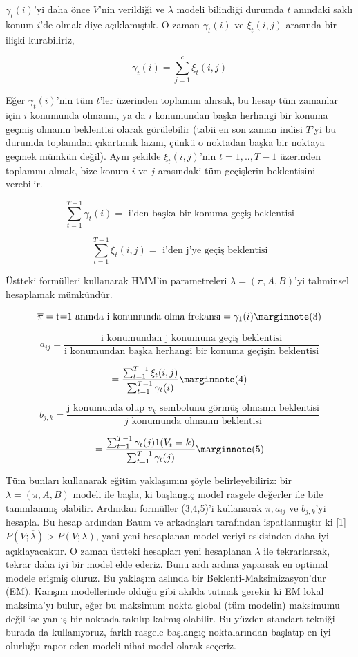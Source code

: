 \documentclass[12pt,fleqn]{article}\usepackage{../../common}
\begin{document}
$\gamma_t(i)$'yi daha önce $V$'nin verildiği ve $\lambda$ modeli bilindiği
durumda $t$ anındaki saklı konum $i$'de olmak diye açıklamıştık. O zaman 
$\gamma_t(i)$ ve $\xi_t(i,j)$ arasında bir ilişki kurabiliriz,

$$ \gamma_t(i) =  \sum_{j=1}^{c} \xi_t(i,j) $$

Eğer $\gamma_t(i)$'nin tüm $t$'ler üzerinden toplamını alırsak, bu hesap
tüm zamanlar için $i$ konumunda olmanın, ya da $i$ konumundan başka
herhangi bir konuma geçmiş olmanın beklentisi olarak görülebilir (tabii en
son zaman indisi $T$'yi bu durumda toplamdan çıkartmak lazım, çünkü o
noktadan başka bir noktaya geçmek mümkün değil). Aynı şekilde
$\xi_t(i,j)$'nin $t=1,..,T-1$ üzerinden toplamını almak, bize konum $i$ ve
$j$ arasındaki tüm geçişlerin beklentisini verebilir.


$$ \sum_{t=1}^{T-1} \gamma_t(i) = \textrm{ i'den başka bir konuma geçiş beklentisi} $$

$$ \sum_{t=1}^{T-1} \xi_t(i,j) = \textrm{ i'den j'ye geçiş beklentisi} $$

Üstteki formülleri kullanarak HMM'in parametreleri $\lambda = (\pi,A,B)
$'yi tahminsel hesaplamak mümkündür. 

$$ \overline{\pi} = \textrm{t=1 anında i konumunda olma frekansı} = \gamma_1(i)
\mlabel{3}
$$

$$ \overline{a_{ij}} = \frac{\textrm{i konumundan j konumuna geçiş beklentisi}}
{\textrm{i konumundan başka herhangi bir konuma geçişin beklentisi}}
$$

$$  = \frac{ \sum_{t=1}^{T-1}\xi_t(i,j) }{ \sum_{t=1}^{T-1} \gamma_t(i) } 
\mlabel{4}
$$

$$ 
\overline{b_{j,k}} = 
\frac{\textrm{j konumunda olup } v_k \textrm{ sembolunu görmüş olmanın beklentisi}}
{j \textrm{ konumunda olmanın beklentisi} }
 $$

$$ = \frac{\sum_{t=1}^{T-1} \gamma_t(j) 1(V_t=k) }{\sum_{t=1}^{T-1}\gamma_t(j) } 
\mlabel{5}
$$

Tüm bunları kullanarak eğitim yaklaşımını şöyle belirleyebiliriz: bir
$\lambda=(\pi,A,B)$ modeli ile başla, ki başlangıç model rasgele değerler
ile bile tanımlanmış olabilir. Ardından formüller (3,4,5)'i kullanarak
$\overline{\pi},\overline{a_{ij}}$ ve $\overline{b_{j,k}}$'yi hesapla. Bu
hesap  ardından Baum ve arkadaşları  tarafından ispatlanmıştır ki [1]
$P(V;\overline{\lambda}) > P(V;\lambda)$, yani  yeni hesaplanan model
veriyi  eskisinden daha iyi açıklayacaktır.  O zaman  üstteki hesapları 
yeni hesaplanan $\overline{\lambda}$ ile tekrarlarsak, tekrar daha 
iyi bir model elde ederiz. Bunu ardı ardına yaparsak en optimal 
modele erişmiş oluruz. Bu yaklaşım aslında bir Beklenti-Maksimizasyon'dur (EM). 
Karışım modellerinde olduğu gibi akılda tutmak gerekir ki EM lokal
maksima'yı bulur, eğer bu maksimum nokta global (tüm modelin) maksimumu
değil ise yanlış bir noktada takılıp kalmış olabilir. Bu yüzden standart
tekniği burada da kullanıyoruz, farklı rasgele başlangıç noktalarından
başlatıp en iyi olurluğu rapor eden modeli nihai model olarak seçeriz. 
\end{document}
